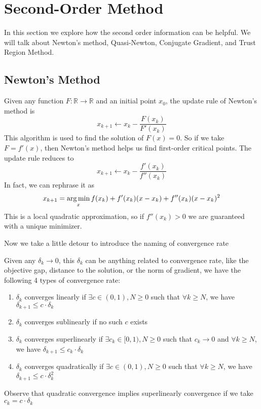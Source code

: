 \chapter{Second-Order Method}
In this section we explore how the second order information can be helpful. We will talk about Newton's method, Quasi-Newton, Conjugate Gradient, and Trust Region Method. 

\section{Newton's Method}
Given any function $F: \mathbb{R} \rightarrow \mathbb{R}$ and an initial point $x_0$, the update rule of Newton's method is
\begin{equation*}
    x_{k+1} \leftarrow x_k - \frac{F(x_k)}{F'(x_k)}
\end{equation*}
This algorithm is used to find the solution of $F(x) = 0$. So if we take $F = f'(x)$, then Newton's method helps us find first-order critical points. The update rule reduces to 
\begin{equation*}
    x_{k+1} \leftarrow x_k - \frac{f'(x_k)}{f''(x_k)}
\end{equation*}
In fact, we can rephrase it as
\begin{equation*}
    x_{k+1} = \operatorname*{arg\,min}_x f(x_k) + f'(x_k)(x-x_k) + f''(x_k)(x-x_k)^2
\end{equation*}
This is a local quadratic approximation, so if $f''(x_k) > 0$ we are guaranteed with a unique minimizer. 

Now we take a little detour to introduce the naming of convergence rate

\begin{note}
    Given any $\delta_k \rightarrow 0$, this $\delta_k$ can be anything related to convergence rate, like the objective gap, distance to the solution, or the norm of gradient, we have the following 4 types of convergence rate:
    \begin{enumerate}
        \item $\delta_k$ converges linearly if $\exists c \in (0, 1), N \geq 0$ such that $\forall k \geq N$, we have $\delta_{k+1} \leq c \cdot \delta_k$
        \item $\delta_k$ converges sublinearly if no such $c$ exists
        \item $\delta_k$ converges superlinearly if $\exists c_k \in [0, 1), N \geq 0$ such that $c_k \rightarrow 0$ and $\forall k \geq N$, we have $\delta_{k+1} \leq c_k \cdot \delta_k$
        \item $\delta_k$ converges quadratically if $\exists c \in (0, 1), N \geq 0$ such that $\forall k \geq N$, we have $\delta_{k+1} \leq c \cdot \delta_k^2$
    \end{enumerate}
    Observe that quadratic convergence implies superlinearly convergence if we take $c_k = c \cdot \delta_k$
\end{note}